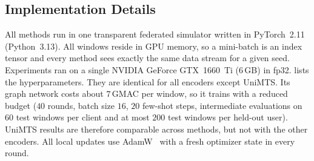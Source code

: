 \subsection{Implementation Details}\label{sec:data:impl}

All methods run in one transparent federated simulator written in PyTorch~2.11 (Python~3.13). All
windows reside in GPU memory, so a mini-batch is an index tensor and every method sees exactly the same
data stream for a given seed. Experiments ran on a single NVIDIA GeForce GTX~1660~Ti (6\,GB) in fp32.
 lists the hyperparameters. They are identical for all encoders except UniMTS. Its
graph network costs about $7$\,GMAC per window, so it trains with a reduced budget ($40$ rounds,
batch size $16$, $20$ few-shot steps, intermediate evaluations on $60$ test windows per client and at most
$200$ test windows per held-out user). UniMTS results are therefore comparable across methods, but
not with the other encoders. All local updates use AdamW~\cite{loshchilov2019adamw} with a fresh
optimizer state in every round.

